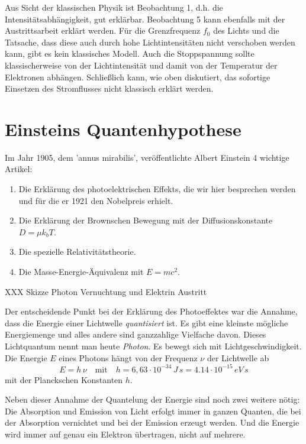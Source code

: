 Aus Sicht der klassischen Physik ist Beobachtung 1, d.h. die Intensitätsabhängigkeit, gut erklärbar. Beobachtung 5 kann ebenfalls mit der Austrittsarbeit erklärt werden. Für die Grenzfrequenz $f_0$ des Lichts und die Tatsache, dass diese auch durch hohe Lichtintensitäten nicht verschoben werden kann, gibt es kein klassisches Modell. Auch die Stoppspannung sollte klassischerweise von der Lichtintensität und damit von der Temperatur der Elektronen abhängen. Schließlich kann, wie oben diskutiert, das sofortige Einsetzen des Stromflusses nicht klassisch erklärt werden.


\section{Einsteins Quantenhypothese}

Im Jahr 1905, dem 'annus mirabilis',  veröffentlichte Albert Einstein 4 wichtige Artikel:
\begin{enumerate}
    \item Die Erklärung des photoelektrischen Effekts, die wir hier besprechen werden und für die er 1921 den Nobelpreis erhielt.
    \item Die Erklärung der Brownschen Bewegung mit der Diffusionskonstante $D = \mu k_b T$.
    \item Die spezielle Relativitätstheorie.
    \item Die Masse-Energie-Äquivalenz mit $E = m c^2$.
\end{enumerate}

\begin{marginfigure}
    \caption{XXX Skizze Photon Vernuchtung und Elektrin Austritt }
   \end{marginfigure}


Der entscheidende Punkt bei der Erklärung des Photoeffektes war die Annahme, dass die Energie einer Lichtwelle \emph{quantisiert} ist. Es gibt eine kleinste mögliche Energiemenge und alles andere sind ganzzahlige Vielfache davon. Dieses Lichtquantum nennt man heute \emph{Photon}. Es bewegt sich mit Lichtgeschwindigkeit.  Die Energie $E$ eines Photons hängt von der Frequenz $\nu$ der Lichtwelle ab
\begin{equation}
    E = h \, \nu \quad \text{mit} \quad h = 6,63 \cdot 10^{-34} \, J \, s = 4.14 \cdot 10^{-15}\, eV \, s
\end{equation}
mit der Planckschen Konstanten $h$. 

Neben dieser Annahme der Quantelung der Energie sind noch zwei weitere nötig: Die Absorption und Emission von Licht erfolgt immer in ganzen Quanten, die bei der Absorption vernichtet und bei der Emission erzeugt werden. Und die Energie wird immer auf genau ein Elektron übertragen, nicht auf mehrere.

